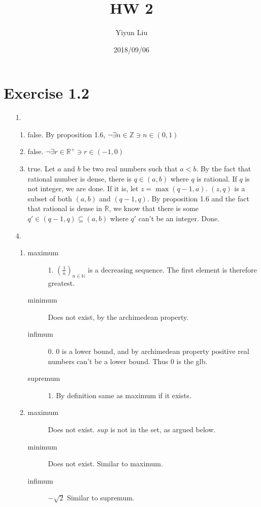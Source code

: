 \documentclass{article}
\title{HW 2}
\date{2018/09/06}
\author{Yiyun Liu}
\begin{document}
\maketitle
\lstset{basicstyle=\ttfamily}

\section*{Exercise 1.2}
\begin{itemize}
\item [1.]
  \begin{enumerate}[label=\alph*.]
  \item false. By proposition 1.6, $\neg \exists n \in \mathbb{Z} \ni n \in (0,1)$
  \item false. $\neg \exists r \in \mathbb{R}^+ \ni r \in (-1,0)$
  \item true. Let $a$ and $b$ be two real numbers such that $a<b$. By the fact that rational number is dense, there is $q \in (a,b)$ where $q$ is rational. If $q$ is not integer, we are done. If it is, let $z = \max(q-1,a)$. $(z,q)$ is a subset of both $(a,b)$ and $(q-1,q)$. By proposition 1.6 and the fact that rational is dense in $\mathbb{R}$, we know that there is some $q' \in (q-1,q) \subseteq (a,b)$ where $q'$ can't be an integer. Done.
  \end{enumerate}
\item [4.]
  \begin{enumerate}[label=\alph*.]
  \item
    \begin{description}
    \item [maximum] 1. $(\frac{1}{n})_{n \in \mathbb{N}}$ is a decreasing sequence. The first element is therefore greatest.
    \item[minimum] Does not exist, by the archimedean property.
    \item[infimum] 0. $0$ is a lower bound, and by archimedean property positive real numbers can't be a lower bound. Thus $0$ is the glb.
    \item[supremum] 1. By definition same as maximum if it exists.
    \end{description}
  \item
    \begin{description}
    \item [maximum] Does not exist. $sup$ is not in the set, as argued below.
    \item [minimum] Does not exist. Similar to maximum.
    \item[infimum] $-\sqrt{2}$ Similar to supremum.

\end{description}
\end{enumerate}
\end{itemize}
\end{document}
